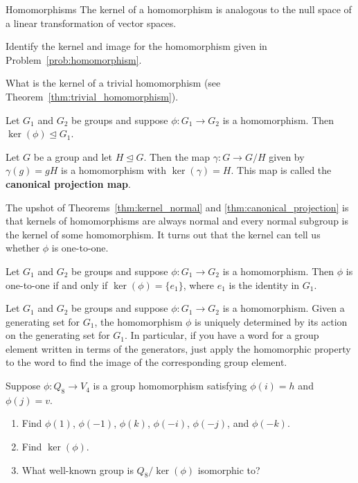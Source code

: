 \begin{section}{Homomorphisms}
The kernel of a homomorphism is analogous to the null space of a linear transformation of vector spaces.  

\begin{problem}
Identify the kernel and image for the homomorphism given in Problem~\ref{prob:homomorphism}.
\end{problem}

\begin{problem}
What is the kernel of a trivial homomorphism (see Theorem~\ref{thm:trivial_homomorphism}).
\end{problem}

\begin{theorem}\label{thm:kernel_normal}
Let $G_1$ and $G_2$ be groups and suppose $\phi:G_1\to G_2$ is a homomorphism. Then $\ker(\phi)\trianglelefteq G_1$.
\end{theorem}

\begin{theorem}\label{thm:canonical_projection}
Let $G$ be a group and let $H\trianglelefteq G$.  Then the map $\gamma:G\to G/H$ given by $\gamma(g)=gH$ is a homomorphism with $\ker(\gamma)=H$. This map is called the \textbf{canonical projection map}.
\end{theorem}

The upshot of Theorems~\ref{thm:kernel_normal} and \ref{thm:canonical_projection} is that kernels of homomorphisms are always normal and every normal subgroup is the kernel of some homomorphism. It turns out that the kernel can tell us whether $\phi$ is one-to-one.

\begin{theorem}
Let $G_1$ and $G_2$ be groups and suppose $\phi:G_1\to G_2$ is a homomorphism. Then $\phi$ is one-to-one if and only if $\ker(\phi)=\{e_1\}$, where $e_1$ is the identity in $G_1$.
\end{theorem}

\begin{remark}
Let $G_1$ and $G_2$ be groups and suppose $\phi:G_1\to G_2$ is a homomorphism. Given a generating set for $G_1$, the homomorphism $\phi$ is uniquely determined by its action on the generating set for $G_1$.  In particular, if you have a word for a group element written in terms of the generators, just apply the homomorphic property to the word to find the image of the corresponding group element.
\end{remark}

\begin{problem}\label{prob:Q8toV4}
Suppose $\phi: Q_8\to V_{4}$ is a group homomorphism satisfying $\phi(i)=h$ and $\phi(j)=v$.
\begin{enumerate}[label=\rm{(\alph*)}]
\item Find $\phi(1)$, $\phi(-1)$, $\phi(k)$, $\phi(-i)$, $\phi(-j)$, and $\phi(-k)$.
\item Find $\ker(\phi)$.
\item What well-known group is $Q_8/\ker(\phi)$ isomorphic to?
\end{enumerate}
\end{problem}


\end{section}
